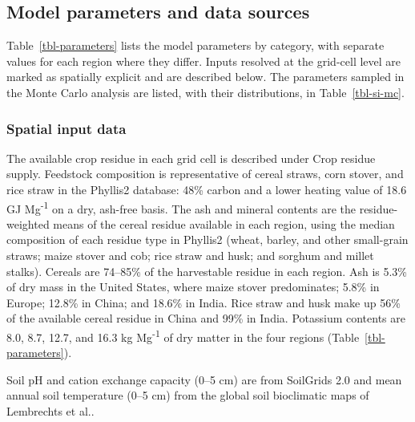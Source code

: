 \documentclass[
  letterpaper,
  twoside,
  twocolumn,
  9pt]{article}
\begin{document}
\subsection{Model parameters and data
sources}\label{model-parameters-and-data-sources}

Table~\ref{tbl-parameters} lists the model parameters by category, with
separate values for each region where they differ. Inputs resolved at
the grid-cell level are marked as spatially explicit and are described
below. The parameters sampled in the Monte Carlo analysis are listed,
with their distributions, in Table~\ref{tbl-si-mc}.

\subsubsection{Spatial input data}\label{spatial-input-data}

The available crop residue in each grid cell is described under Crop
residue supply. Feedstock composition is representative of cereal
straws, corn stover, and rice straw in the Phyllis2
database:\citep{phyllis2} 48\% carbon and a lower heating value of 18.6
GJ Mg\textsuperscript{-1} on a dry, ash-free basis. The ash and mineral
contents are the residue-weighted means of the cereal residue available
in each region, using the median composition of each residue type in
Phyllis2 (wheat, barley, and other small-grain straws; maize stover and
cob; rice straw and husk; and sorghum and millet stalks). Cereals are
74--85\% of the harvestable residue in each region. Ash is 5.3\% of dry
mass in the United States, where maize stover predominates; 5.8\% in
Europe; 12.8\% in China; and 18.6\% in India. Rice straw and husk make
up 56\% of the available cereal residue in China and 99\% in India.
Potassium contents are 8.0, 8.7, 12.7, and 16.3 kg
Mg\textsuperscript{-1} of dry matter in the four regions
(Table~\ref{tbl-parameters}).

Soil pH and cation exchange capacity (0--5 cm) are from SoilGrids 2.0
\citep{poggio2021} and mean annual soil temperature (0--5 cm) from the
global soil bioclimatic maps of Lembrechts et al.\citep{lembrechts2022}.
\end{document}
